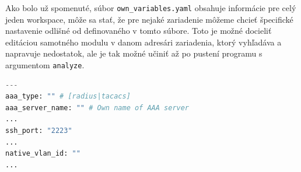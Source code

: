Ako bolo už spomenuté, súbor \texttt{own\_variables.yaml} obsahuje informácie pre celý jeden workspace, môže sa stať, že pre nejaké zariadenie môžeme chcieť špecifické nastavenie odlišné od definovaného v tomto súbore. Toto je možné docieliť editáciou samotného modulu v danom adresári zariadenia, ktorý vyhľadáva a napravuje nedostatok, ale je tak možné učiniť až po pustení programu s argumentom \texttt{analyze}.
\begin{lstlisting}[frame=single,numbers=right,caption={Skrátený konfiguračný súbor \texttt{own\_variables.yaml} definujúci premenné potrebné na genrovanie nápravy},label=yaml:variables,basicstyle=\ttfamily\small, keywordstyle=\color{black},language=python,breaklines=true]
---
aaa_type: "" # [radius|tacacs]
aaa_server_name: "" # Own name of AAA server
...
ssh_port: "2223"
...
native_vlan_id: ""
...
\end{lstlisting}


